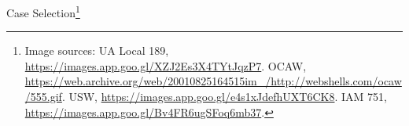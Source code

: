 \documentclass{beamer}
\begin{document}
\begin{frame}{Case Selection\footnote{Image sources: UA Local 189, \url{https://images.app.goo.gl/XZJ2Es3X4TYtJqzP7}. OCAW, \url{https://web.archive.org/web/20010825164515im_/http://webshells.com/ocaw/555.gif}. USW, \url{https://images.app.goo.gl/e4s1xJdefhUXT6CK8}. IAM 751, \url{https://images.app.goo.gl/Bv4FR6ugSFoq6mb37}.}}
\begin{figure}
\end{figure}


\end{frame}
\end{document}
